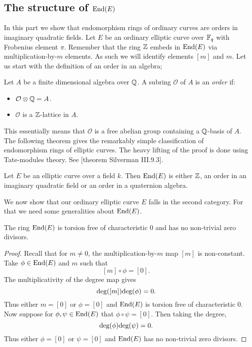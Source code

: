 \documentclass[../main/main.tex]{subfiles}
\begin{document}
\subsection{The structure of $\text{End}(E)$}
In this part we show that endomorphism rings of ordinary curves are orders in imaginary quadratic fields.
Let $E$ be an ordinary elliptic curve over $\mathbb{F}_q$ with Frobenius element $\pi$.
Remember that the ring $\mathbb{Z}$ embeds in $\text{End}(E)$ via multiplication-by-$m$ elements.
As such we will identify elements $[m]$ and $m$.
Let us start with the definition of an order in an algebra;
\begin{definition}
	Let $A$ be a finite dimensional algebra over $\mathbb{Q}$. A subring $\mathcal{O}$ of $A$ is an \textit{order} if:
	\begin{itemize}
		\item $\mathcal{O}\otimes\mathbb{Q} = A$.
		\item $\mathcal{O}$ is a $\mathbb{Z}$-lattice in $A$.
	\end{itemize}
\end{definition}
This essentially means that $\mathcal{O}$ is a free abelian group containing a $\mathbb{Q}$-basis of $A$.
The following theorem gives the remarkably simple classification of endomorphism rings of elliptic curves.
The heavy lifting of the proof is done using Tate-modules theory.
See [theorem Silverman III.9.3].
\begin{theorem}
	Let $E$ be an elliptic curve over a field $k$.
	Then $\text{End}(E)$ is either $\mathbb{Z}$, an order in an imaginary quadratic field or an order in a quaternion algebra.
\end{theorem}
We now show that our ordinary elliptic curve $E$ falls in the second category.
For that we need some generalities about $\text{End}(E)$.
\begin{proposition}
	The ring $\text{End}(E)$ is torsion free of characteristic $0$ and has no non-trivial zero divisors.
\end{proposition}
\begin{proof}
	Recall that for $m\neq 0$, the multiplication-by-$m$ map $[m]$ is non-constant.
	Take $\phi\in\text{End}(E)$ and $m$ such that
	\[
		[m]\circ\phi = [0].
	\]
	The multiplicativity of the degree map gives
	\[
		\text{deg}([m])\text{deg}(\phi) = 0.
	\]
	Thus either $m = [0]$ or $\phi = [0]$ and $\text{End}(E)$ is torsion free of characteristic $0$.
	Now suppose for $\phi, \psi\in\text{End}(E)$ that $\phi\circ\psi = [0]$.
	Then taking the degree,
	\[\text{deg}(\phi)\text{deg}(\psi) = 0.\]
	Thus either $\phi = [0]$ or $\psi = [0]$ and $\text{End}(E)$ has no non-trivial zero divisors.
\end{proof}
\end{document}

